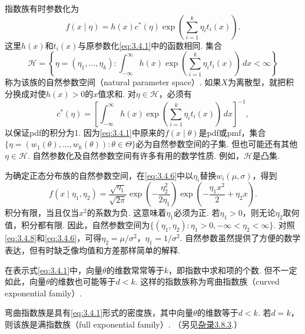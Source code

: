 指数族有时参数化为
\begin{equation}\label{eq:3.4.7}
f(x\mid\eta)=h(x)c^*(\eta)\exp\left(\sum_{i=1}^k\eta_i t_i(x)\right).
\end{equation}
这里$h(x)$和$t_i(x)$与原参数化\eqref{eq:3.4.1}中的函数相同. 集合
$$\mathcal H=\left\{\eta=(\eta_1,\ldots,\eta_k):\int_{-\infty}^\infty h(x)\exp\left(\sum_{i=1}^k\eta_i t_i(x)\right)\,dx<\infty\right\}$$
称为该族的自然参数空间（natural parameter space）. 如果$X$为离散型，就把积分换成对使$h(x)>0$的$x$值求和. 对$\eta\in\mathcal H$，必须有
$$c^*(\eta)=\left[\int_{-\infty}^\infty h(x)\exp\left(\sum_{i=1}^k\eta_i t_i(x)\right)\,dx\right]^{-1},$$
以保证pdf的积分为1. 因为\eqref{eq:3.4.1}中原来的$f(x\mid\theta)$是pdf或pmf，集合$\{\eta=(w_1(\theta),\ldots,w_k(\theta)):\theta\in\Theta\}$必为自然参数空间的子集. 但也可能还有其他$\eta\in\mathcal H$. 自然参数化及自然参数空间有许多有用的数学性质. 例如，$\mathcal H$是凸集.

\begin{example}[续\autoref{ex:3.4.4}]\label{ex:3.4.6}
为确定正态分布族的自然参数空间，在\eqref{eq:3.4.6}中以$\eta_i$替换$w_i(\mu,\sigma)$，得到
\begin{equation}\label{eq:3.4.8}
f(x\mid\eta_1,\eta_2)=\frac{\sqrt{\eta_1}}{\sqrt{2\pi}}\exp\left(-\frac{\eta_2^2}{2\eta_1}\right)\exp\left(-\frac{\eta_1x^2}2+\eta_2x\right).
\end{equation}
积分有限，当且仅当$x^2$的系数为负. 这意味着$\eta_1$必须为正. 若$\eta_1>0$，则无论$\eta_2$取何值，积分都有限. 因此，自然参数空间为$\{(\eta_1,\eta_2):\eta_1>0,-\infty<\eta_2<\infty\}$. 对照\eqref{eq:3.4.8}和\eqref{eq:3.4.6}，可得$\eta_2=\mu/\sigma^2$，$\eta_1=1/\sigma^2$. 自然参数虽然提供了方便的数学表达，但有时缺乏像均值和方差那样简单的解释.
\end{example}
在表示式\eqref{eq:3.4.1}中，向量$\theta$的维数常常等于$k$，即指数中求和项的个数. 但不一定如此，向量$\theta$的维数也可能等于$d<k$. 这样的指数族称为弯曲指数族（curved exponential family）.

\begin{definition}\label{def:3.4.7}
弯曲指数族是具有\eqref{eq:3.4.1}形式的密度族，其中向量$\theta$的维数等于$d<k$. 若$d=k$，则该族是满指数族（full exponential family）. （另见\hyperref[sec:3.8.3]{杂录3.8.3}.）
\end{definition}

